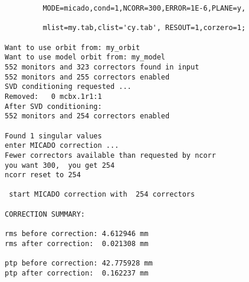 \begin{verbatim}
         MODE=micado,cond=1,NCORR=300,ERROR=1E-6,PLANE=y,

         mlist=my.tab,clist='cy.tab', RESOUT=1,corzero=1;

Want to use orbit from: my_orbit
Want to use model orbit from: my_model
552 monitors and 323 correctors found in input
552 monitors and 255 correctors enabled
SVD conditioning requested ...
Removed:   0 mcbx.1r1:1
After SVD conditioning:             
552 monitors and 254 correctors enabled

Found 1 singular values
enter MICADO correction ...
Fewer correctors available than requested by ncorr
you want 300,  you get 254
ncorr reset to 254
  
 start MICADO correction with  254 correctors
  
CORRECTION SUMMARY:   

rms before correction: 4.612946 mm
rms after correction:  0.021308 mm

ptp before correction: 42.775928 mm
ptp after correction:  0.162237 mm


\end{verbatim}
